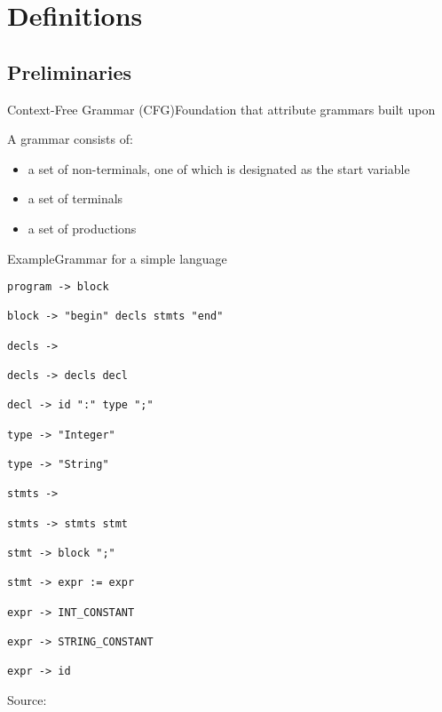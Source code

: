 
\section{Definitions}

\subsection*{Preliminaries}

\begin{frame}{Context-Free Grammar (CFG)}{Foundation that attribute grammars built upon}

A grammar consists of:
\begin{itemize}
    \item a set of non-terminals, one of which is designated as the start variable
    \item a set of terminals
    \item a set of productions
\end{itemize}
\end{frame}


\begin{frame}[fragile=singleslide]{Example}{Grammar for a simple language}

\begin{multicols}{2}
\begin{Verbatim}[fontsize=\scriptsize]
program -> block

block -> "begin" decls stmts "end"

decls ->

decls -> decls decl

decl -> id ":" type ";"

type -> "Integer"

type -> "String"

stmts -> 

stmts -> stmts stmt

stmt -> block ";"

stmt -> expr := expr

expr -> INT_CONSTANT

expr -> STRING_CONSTANT

expr -> id
\end{Verbatim}
\end{multicols}


Source: \cite{Boyland1998AnalyzingDN}

\end{frame}

